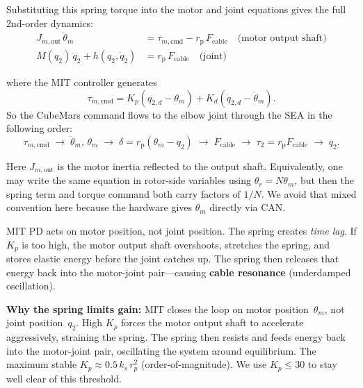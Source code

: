 \documentclass[11pt,a4paper]{article}
\newcommand{\rp}{r_{\mathrm{p}}}
\begin{document}
Substituting this spring torque into the motor and joint equations gives the full 2nd-order dynamics:
\begin{align}
  J_{m,\mathrm{out}}\,\ddot{\theta}_m &= \tau_{m,\mathrm{cmd}} - \rp\,F_{\mathrm{cable}}
  \quad\text{(motor output shaft)}\label{eq:motor_with_spring}\\[0.3em]
  M(q_2)\,\ddot{q}_2 + h(q_2,\dot{q}_2) &= \rp\,F_{\mathrm{cable}} \quad\text{(joint)}\label{eq:joint_with_spring}
\end{align}

where the MIT controller generates
\begin{equation}
  \tau_{m,\mathrm{cmd}} = K_p(q_{2,d} - \theta_m) + K_d(\dot{q}_{2,d} - \dot{\theta}_m).
  \label{eq:tau_m_cmd}
\end{equation}
So the CubeMars command flows to the elbow joint through the SEA in the following order:
\begin{equation}
  \tau_{m,\mathrm{cmd}}
  \;\longrightarrow\;
  \ddot{\theta}_m,\,\theta_m
  \;\longrightarrow\;
  \delta = \rp(\theta_m-q_2)
  \;\longrightarrow\;
  F_{\mathrm{cable}}
  \;\longrightarrow\;
  \tau_2 = \rp F_{\mathrm{cable}}
  \;\longrightarrow\;
  q_2.
  \label{eq:sea_signal_flow}
\end{equation}

Here $J_{m,\mathrm{out}}$ is the motor inertia reflected to the output shaft.
Equivalently, one may write the same equation in rotor-side variables using
$\theta_r = N\theta_m$, but then the spring term and torque command both carry
factors of $1/N$.  We avoid that mixed convention here because the hardware gives
$\theta_m$ directly via CAN.

MIT PD acts on motor position, not joint position.  The spring creates \emph{time lag}.
If $K_p$ is too high, the motor output shaft overshoots, stretches the spring, and stores
elastic energy before the joint catches up.  The spring then releases that energy back into
the motor-joint pair---causing \textbf{cable resonance} (underdamped oscillation).

\begin{resultbox}
\textbf{Why the spring limits gain:}
MIT closes the loop on motor position~$\theta_m$, not joint position~$q_2$.
High $K_p$ forces the motor output shaft to accelerate aggressively, straining the spring.
The spring then resists and feeds energy back into the motor-joint pair, oscillating the
system around equilibrium.
The maximum stable $K_p \approx 0.5\,k_s\,r_p^2$ (order-of-magnitude).
We use $K_p \le 30$ to stay well clear of this threshold.
\end{resultbox}
\end{document}
